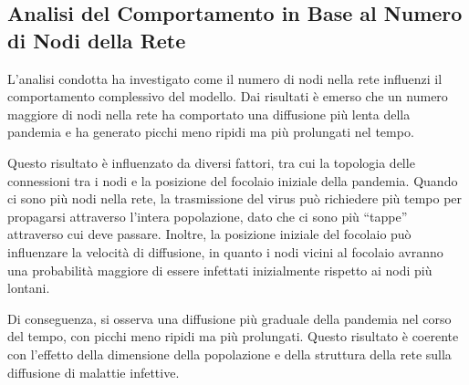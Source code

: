 \subsection{Analisi del Comportamento in Base al Numero di Nodi della Rete}

L'analisi condotta ha investigato come il numero di nodi nella rete 
influenzi il comportamento complessivo del modello. 
Dai risultati è emerso che un numero maggiore di nodi nella rete ha 
comportato una diffusione più lenta della pandemia e ha generato picchi 
meno ripidi ma più prolungati nel tempo.

Questo risultato è influenzato da diversi fattori, tra cui la 
topologia delle connessioni tra i nodi e la posizione del focolaio 
iniziale della pandemia. Quando ci sono più nodi nella rete, 
la trasmissione del virus può richiedere più tempo per propagarsi 
attraverso l'intera popolazione, dato che ci sono più ``tappe'' attraverso 
cui deve passare. Inoltre, la posizione iniziale del focolaio può 
influenzare la velocità di diffusione, in quanto i nodi vicini al 
focolaio avranno una probabilità maggiore di essere infettati 
inizialmente rispetto ai nodi più lontani.

Di conseguenza, si osserva una diffusione più graduale della pandemia 
nel corso del tempo, con picchi meno ripidi ma più prolungati. 
Questo risultato è coerente con l'effetto della dimensione della 
popolazione e della struttura della rete sulla diffusione di malattie 
infettive.

